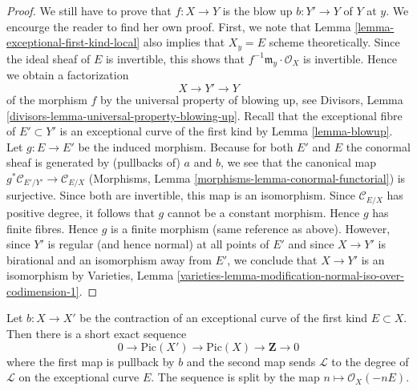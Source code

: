 \begin{proof}
\medskip\noindent
We still have to prove that $f : X \to Y$ is the blow up $b : Y' \to Y$
of $Y$ at $y$. We encourge the reader to find her own proof.
First, we note that Lemma \ref{lemma-exceptional-first-kind-local}
also implies that $X_y = E$ scheme theoretically.
Since the ideal sheaf of $E$ is invertible, this shows
that $f^{-1}\mathfrak m_y \cdot \mathcal{O}_X$ is invertible.
Hence we obtain a factorization
$$
X \to Y' \to Y
$$
of the morphism $f$ by the universal property of blowing up, see
Divisors, Lemma \ref{divisors-lemma-universal-property-blowing-up}.
Recall that the exceptional fibre of $E' \subset Y'$ is an exceptional
curve of the first kind by Lemma \ref{lemma-blowup}.
Let $g : E \to E'$ be the induced morphism.
Because for both $E'$ and $E$ the conormal sheaf is generated
by (pullbacks of) $a$ and $b$, we see that the canonical map
$g^*\mathcal{C}_{E'/Y'} \to \mathcal{C}_{E/X}$
(Morphisms, Lemma \ref{morphisms-lemma-conormal-functorial})
is surjective. Since both are invertible, this map is an isomorphism.
Since $\mathcal{C}_{E/X}$ has positive degree, it follows that $g$
cannot be a constant morphism.
Hence $g$ has finite fibres. Hence $g$ is a finite morphism
(same reference as above). However, since $Y'$ is regular
(and hence normal) at all points of $E'$ and since $X \to Y'$
is birational and an isomorphism away from $E'$, we conclude
that $X \to Y'$ is an isomorphism by
Varieties, Lemma
\ref{varieties-lemma-modification-normal-iso-over-codimension-1}.
\end{proof}

\begin{lemma}
\label{lemma-pic-blowup}
Let $b : X \to X'$ be the contraction of an
exceptional curve of the first kind $E \subset X$.
Then there is a short exact sequence
$$
0 \to \text{Pic}(X') \to \text{Pic}(X) \to \mathbf{Z} \to 0
$$
where the first map is pullback by $b$ and the second map sends
$\mathcal{L}$ to the degree of $\mathcal{L}$ on the exceptional
curve $E$. The sequence is split by the map
$n \mapsto \mathcal{O}_X(-nE)$.
\end{lemma}

